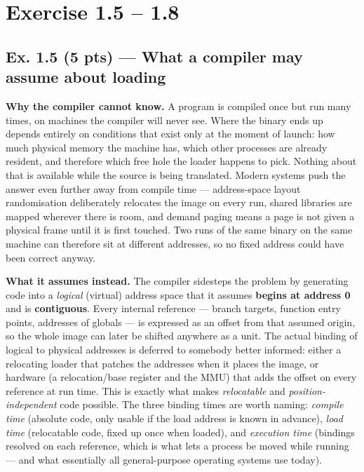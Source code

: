 \section*{Exercise 1.5 -- 1.8}
\label{p2:sec:main}

\subsection*{Ex. 1.5 (5 pts) --- What a compiler may assume about loading}
\label{p2:sec:loadassumptions}

\textbf{Why the compiler cannot know.} A program is compiled once but run many times, on
machines the compiler will never see. Where the binary ends up depends entirely on
conditions that exist only at the moment of launch: how much physical memory the machine
has, which other processes are already resident, and therefore which free hole the loader
happens to pick. Nothing about that is available while the source is being translated.
Modern systems push the answer even further away from compile time --- address-space
layout randomisation deliberately relocates the image on every run, shared libraries are
mapped wherever there is room, and demand paging means a page is not given a physical
frame until it is first touched. Two runs of the same binary on the same machine can
therefore sit at different addresses, so no fixed address could have been correct anyway.

\textbf{What it assumes instead.} The compiler sidesteps the problem by generating code
into a \emph{logical} (virtual) address space that it assumes \textbf{begins at address
0} and is \textbf{contiguous}. Every internal reference --- branch targets, function
entry points, addresses of globals --- is expressed as an offset from that assumed
origin, so the whole image can later be shifted anywhere as a unit. The actual binding of
logical to physical addresses is deferred to somebody better informed: either a
relocating loader that patches the addresses when it places the image, or hardware (a
relocation/base register and the MMU) that adds the offset on every reference at run
time. This is exactly what makes \emph{relocatable} and \emph{position-independent} code
possible. The three binding times are worth naming: \emph{compile time} (absolute code,
only usable if the load address is known in advance), \emph{load time} (relocatable code,
fixed up once when loaded), and \emph{execution time} (bindings resolved on each
reference, which is what lets a process be moved while running --- and what essentially
all general-purpose operating systems use today).

